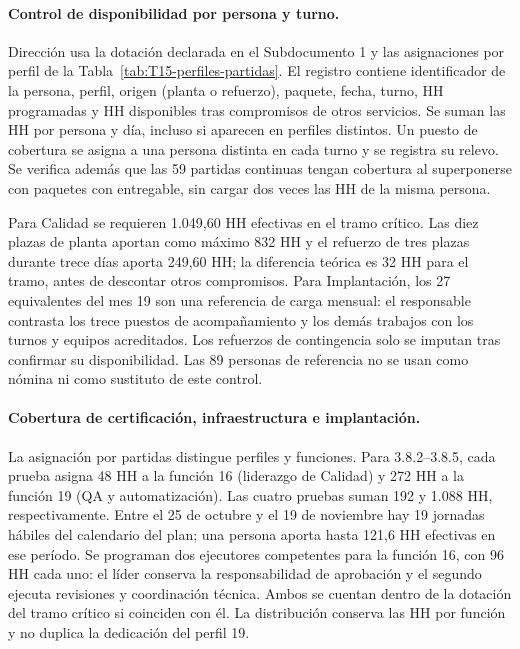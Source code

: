 \paragraph{Control de disponibilidad por persona y turno.}
Dirección usa la dotación declarada en el Subdocumento 1 y las asignaciones por perfil de la Tabla~\ref{tab:T15-perfiles-partidas}. El registro contiene identificador de la persona, perfil, origen (planta o refuerzo), paquete, fecha, turno, HH programadas y HH disponibles tras compromisos de otros servicios. Se suman las HH por persona y día, incluso si aparecen en perfiles distintos. Un puesto de cobertura se asigna a una persona distinta en cada turno y se registra su relevo. Se verifica además que las 59 partidas continuas tengan cobertura al superponerse con paquetes con entregable, sin cargar dos veces las HH de la misma persona.

Para Calidad se requieren 1.049,60 HH efectivas en el tramo crítico. Las diez plazas de planta aportan como máximo 832 HH y el refuerzo de tres plazas durante trece días aporta 249,60 HH; la diferencia teórica es 32 HH para el tramo, antes de descontar otros compromisos. Para Implantación, los 27 equivalentes del mes 19 son una referencia de carga mensual: el responsable contrasta los trece puestos de acompañamiento y los demás trabajos con los turnos y equipos acreditados. Los refuerzos de contingencia solo se imputan tras confirmar su disponibilidad. Las 89 personas de referencia no se usan como nómina ni como sustituto de este control.

\paragraph{Cobertura de certificación, infraestructura e implantación.}
La asignación por partidas distingue perfiles y funciones. Para 3.8.2--3.8.5, cada prueba asigna 48 HH a la función 16 (liderazgo de Calidad) y 272 HH a la función 19 (QA y automatización). Las cuatro pruebas suman 192 y 1.088 HH, respectivamente. Entre el 25 de octubre y el 19 de noviembre hay 19 jornadas hábiles del calendario del plan; una persona aporta hasta 121,6 HH efectivas en ese período. Se programan dos ejecutores competentes para la función 16, con 96 HH cada uno: el líder conserva la responsabilidad de aprobación y el segundo ejecuta revisiones y coordinación técnica. Ambos se cuentan dentro de la dotación del tramo crítico si coinciden con él. La distribución conserva las HH por función y no duplica la dedicación del perfil 19.


